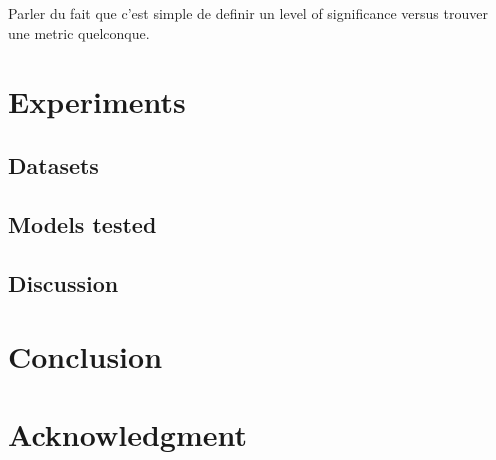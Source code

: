 \documentclass{article}
\begin{document}
Parler du fait que c'est simple de definir un level of significance versus trouver une metric quelconque.

\section{Experiments}

\subsection{Datasets}

\subsection{Models tested}

\subsection{Discussion}

\section{Conclusion}

\section{Acknowledgment}



\end{document}
